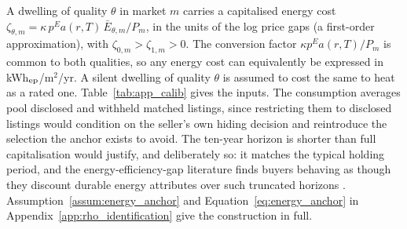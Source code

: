 A dwelling of quality $\theta$ in market $m$ carries a capitalised energy cost $\zeta_{\theta,m}=\kappa\,p^E a(r,T)\,\bar E_{\theta,m}/P_m$, in the units of the log price gaps (a first-order approximation), with $\zeta_{0,m}>\zeta_{1,m}>0$. The conversion factor $\kappa p^Ea(r,T)/P_m$ is common to both qualities, so any energy cost can equivalently be expressed in kWh$_{\rm ep}$/m$^2$/yr. A silent dwelling of quality $\theta$ is assumed to cost the same to heat as a rated one. Table~\ref{tab:app_calib} gives the inputs. The consumption averages pool disclosed and withheld matched listings, since restricting them to disclosed listings would condition on the seller's own hiding decision and reintroduce the selection the anchor exists to avoid. The ten-year horizon is shorter than full capitalisation would justify, and deliberately so: it matches the typical holding period, and the energy-efficiency-gap literature finds buyers behaving as though they discount durable energy attributes over such truncated horizons \citep{allcott_is_2012}. Assumption~\ref{assum:energy_anchor} and Equation~\eqref{eq:energy_anchor} in Appendix~\ref{app:rho_identification} give the construction in full.

